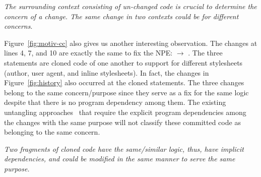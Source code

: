  {\em The surrounding context
  consisting of un-changed code is crucial to determine the
  concern of a change. The same change in two 
  contexts could be for different concerns}.

Figure~\ref{fig:motiv-cc} also gives us another interesting
observation. The changes at lines 4, 7, and 10 are exactly the same to
fix the NPE:  $\rightarrow$ .
The three statements are cloned code of one another to support for
different stylesheets (author, user agent, and inline stylesheets).
In fact, the changes in Figure~\ref{fig:history} also occurred at the
cloned statements. The three changes belong to the same
concern/purpose since they serve as a fix for the same logic despite
that there is no program dependency among them. The existing
untangling
approaches~\cite{flexeme-fse20,smartcommit-fse21,roover-scam18,barnett-icse15}
that require the explicit program dependencies among the changes with
the same purpose will not classify these committed code as belonging
to the same concern.


 {\em Two
  fragments of cloned code have the same/similar logic, thus, have
  implicit dependencies, and could be modified in the same manner to
  serve the same purpose.}




